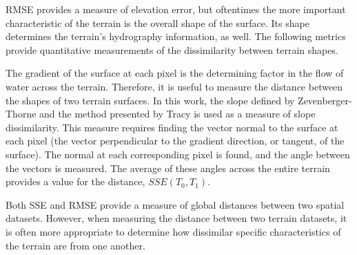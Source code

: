 % 
% 
% 


RMSE provides a measure of elevation error, but oftentimes the more important characteristic of the terrain is the overall shape of the surface. Its shape determines the terrain's hydrography information, as well. The following metrics provide quantitative measurements of the dissimilarity between terrain shapes.

The gradient of the surface at each pixel is the determining factor in the flow of water across the terrain. Therefore, it is useful to measure the distance between the shapes of two terrain surfaces. In this work, the slope defined by Zevenberger-Thorne \cite{ESP:ESP3290120107} and the method presented by Tracy \cite{Tracy:2009:PPS:1751402} is used as a measure of slope dissimilarity. This measure requires finding the vector normal to the surface at each pixel (the vector perpendicular to the gradient direction, or tangent, of the surface). The normal at each corresponding pixel is found, and the angle between the vectors is measured. The average of these angles across the entire terrain provides a value for the distance, $SSE\left(T_{0}, T_{1}\right)$.

% 



Both SSE and RMSE provide a measure of global distances between two spatial datasets. However, when measuring the distance between two terrain datasets, it is often more appropriate to determine how dissimilar specific characteristics of the terrain are from one another.

